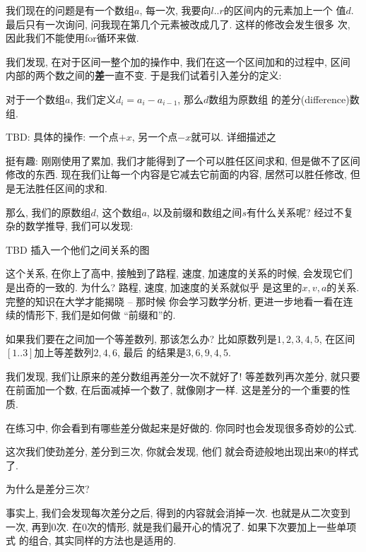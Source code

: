 我们现在的问题是有一个数组$a$, 每一次, 我要向$l..r$的区间内的元素加上一个
值$d$. 最后只有一次询问, 问我现在第几个元素被改成几了. 这样的修改会发生很多
次, 因此我们不能使用for循环来做. 

我们发现, 在对于区间一整个加的操作中, 我们在这一个区间加和的过程中, 区间
内部的两个数之间的\textbf{差}一直不变. 于是我们试着引入差分的定义: 

\begin{definition}
    对于一个数组$a$, 我们定义$d_i=a_i-a_{i-1}$, 那么$d$数组为原数组
    的差分(difference)数组. 
\end{definition}

TBD: 具体的操作: 一个点$+x$, 另一个点$-x$就可以. 详细描述之

挺有趣: 刚刚使用了累加, 我们才能得到了一个可以胜任区间求和, 但是做不了区间
修改的东西. 现在我们让每一个内容是它减去它前面的内容, 居然可以胜任修改, 
但是无法胜任区间的求和. 

那么, 我们的原数组$d$, 这个数组$a$, 以及前缀和数组之间$s$有什么关系呢? 
经过不复杂的数学推导, 我们可以发现: 

TBD 插入一个他们之间关系的图

\begin{remark}
    这个关系, 在你上了高中, 接触到了路程, 速度, 加速度的关系的时候, 
    会发现它们是出奇的一致的. 为什么? 路程, 速度, 加速度的关系就似乎
    是这里的$x, v,a$的关系. 完整的知识在大学才能揭晓 -- 那时候
    你会学习数学分析, 更进一步地看一看在连续的情形下, 我们是如何做
    ``前缀和''的. 
\end{remark}

 如果我们要在之间加一个等差数列, 那该怎么办?
比如原数列是$1,2,3,4,5$, 在区间$[1..3]$加上等差数列$2, 4, 6$, 最后
的结果是$3, 6, 9, 4, 5$. 

我们发现, 我们让原来的差分数组再差分一次不就好了! 等差数列再次差分, 就只要
在前面加一个数, 在后面减掉一个数了, 就像刚才一样. 这是差分的一个重要的性质.

在练习中, 你会看到有哪些差分做起来是好做的. 你同时也会发现很多奇妙的公式. 

 这次我们使劲差分, 差分到三次, 你就会发现, 他们
就会奇迹般地出现出来0的样式了. 

\begin{ques}
    为什么是差分三次?
\end{ques}

事实上, 我们会发现每次差分之后, 得到的内容就会消掉一次. 也就是从二次变到
一次, 再到0次. 在0次的情形, 就是我们最开心的情况了. 如果下次要加上一些单项式
的组合, 其实同样的方法也是适用的. 


